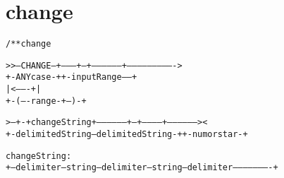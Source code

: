 \section{change}
\begin{shaded}
\begin{alltt}
/** change

  >>--CHANGE--+---------+--+-----------------+---------------------------->
              +-ANYcase-+  +-inputRange------+
                           |    <-------+    |
                           +-(----range-+--)-+

  >--+-+ changeString +-----------------+--+-----------+-----------------><
     +-delimitedString--delimitedString-+  +-numorstar-+

  changeString:
  +--delimiter--string--delimiter--string--delimiter----------------------+

\end{alltt}
\end{shaded}
